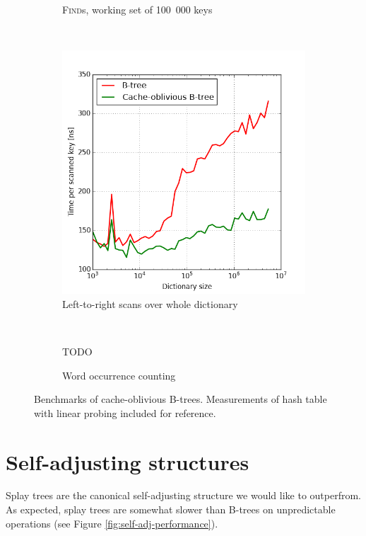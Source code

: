 \begin{figure}
\begin{subfigure}[b]{0.45\textwidth}
	\caption{\textsc{Find}s, working set of 100~000 keys}
\end{subfigure}
~
\begin{subfigure}[b]{0.45\textwidth}
	\includegraphics[width=\textwidth]{img/performance/cob-performance-5}
	\caption{Left-to-right scans over whole dictionary}
\end{subfigure}
~
\begin{subfigure}[b]{0.45\textwidth}
	TODO
	\caption{Word occurrence counting}
\end{subfigure}
\caption{Benchmarks of cache-oblivious B-trees.
	Measurements of hash table with linear probing included for reference.}
\label{fig:cob-performance}
\end{figure}

\section{Self-adjusting structures}
Splay trees are the canonical self-adjusting structure we would like to
outperfrom. As expected, splay trees are somewhat slower than B-trees on
unpredictable operations (see Figure \ref{fig:self-adj-performance}).

